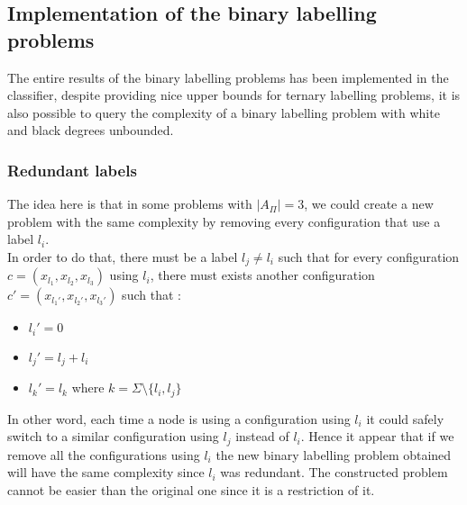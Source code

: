 \subsection{Implementation of the binary labelling problems}
The entire results of the binary labelling problems has been implemented in the classifier, despite providing nice upper bounds for ternary labelling problems, it is also possible to query the complexity of a binary labelling problem with white and black degrees unbounded.
\subsubsection{Redundant labels}
The idea here is that in some problems with $|A_{\Pi}|=3$, we could create a new problem with the same complexity by removing every configuration that use a label $l_i$.\\
In order to do that, there must be a label $l_j\neq l_i$ such that for every configuration $c=(x_{l_1},x_{l_2},x_{l_3})$ using $l_i$, there must exists another configuration $c'=(x_{l_1'},x_{l_2'},x_{l_3'})$ such that : 
\begin{itemize}
    \item $l_i'=0$
    \item $l_j'= l_j+l_i$
    \item $l_k' = l_k$ where $ k = \Sigma \setminus \{l_i,l_j\}$ 
\end{itemize}
In other word, each time a node is using a configuration using $l_i$ it could safely switch to a similar configuration using $l_j$ instead of $l_i$. Hence it appear that if we remove all the configurations using $l_i$ the new binary labelling problem obtained will have the same complexity since $l_i$ was redundant.
The constructed problem cannot be easier than the original one since it is a restriction of it.

